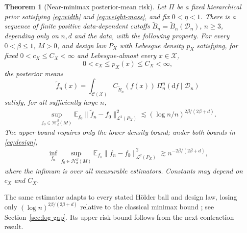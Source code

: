 \documentclass[11pt,a4paper]{article}
\newtheorem{theorem}{Theorem}
\theoremstyle{remark}
\newcommand{\Xcal}{\mathcal X}
\newcommand{\Hcal}{\mathcal H}
\newcommand{\Dcal}{\mathcal D}
\newcommand{\Lcal}{\mathcal L}
\newcommand{\Ccal}{\mathcal C}
\newcommand{\E}{\mathbb E}
\newcommand{\norm}[1]{\lVert#1\rVert}
\begin{document}
\begin{theorem}[Near-minimax posterior-mean risk]\label{cor:risk}
Let $\Pi$ be a fixed hierarchical prior satisfying
\eqref{eq:width} and \eqref{eq:weight-mass}, and fix $0<\eta<1$.
There is a sequence of finite positive data-dependent cutoffs
$\widetilde B_n=\widetilde B_n(\Dcal_n)$, $n\geq3$, depending
only on $n,d$ and the data, with the following property. For every
$0<\beta\leq1$, $M>0$, and design law $P_X$ with Lebesgue density
$p_X$ satisfying, for fixed $0<c_X\leq C_X<\infty$ and
Lebesgue-almost every $x\in\Xcal$,
\begin{equation}\label{eq:design}
0<c_X\leq p_X(x)\leq C_X<\infty,
\end{equation}
the posterior means
\begin{equation}\label{eq:adaptive-mean}
\widetilde f_n(x)=\int_{\Ccal(\Xcal)}
 C_{\widetilde B_n}(f(x))\,
 \Pi_n^\eta(\mathrm d f\mid\Dcal_n)
\end{equation}
satisfy, for all sufficiently large $n$,
\begin{equation}\label{eq:risk}
\begin{split}
\sup_{f_0\in\Hcal_d^\beta(M)}\E_{f_0}
\norm{\widetilde f_n-f_0}_{\Lcal^2(P_X)}^2
\lesssim(\log n/n)^{2\beta/(2\beta+d)}.
\end{split}
\end{equation}
The upper bound requires only the lower density bound;
under both bounds in \eqref{eq:design},
\begin{equation}\label{eq:lower}
\begin{split}
\inf_{f_n}\sup_{f_0\in\Hcal_d^\beta(M)}\E_{f_0}
\norm{f_n-f_0}_{\Lcal^2(P_X)}^2
\gtrsim n^{-2\beta/(2\beta+d)},
\end{split}
\end{equation}
where the infimum is over all measurable estimators. Constants may
depend on $c_X$ and $C_X$.
\end{theorem}

The same estimator adapts to every stated H\"older ball and design
law, losing only $(\log n)^{2\beta/(2\beta+d)}$ relative to the
classical minimax bound \citep{stone1982}; see
Section~\ref{sec:log-gap}. Its upper risk bound follows from the
next contraction result.
\end{document}
